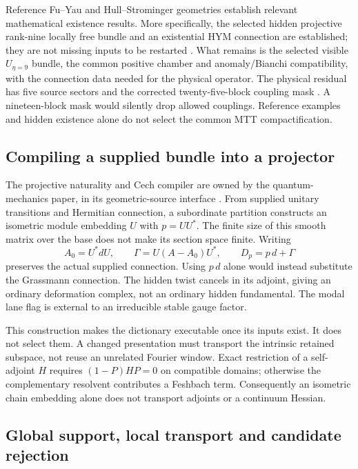 \documentclass[11pt]{article}
\begin{document}
Reference Fu--Yau and Hull--Strominger geometries establish relevant
mathematical existence results. More specifically, the selected hidden
projective rank-nine locally free bundle and an existential HYM connection
are established; they are not missing inputs to be restarted
\cite{OwnerHull}. What remains is the selected visible \(U_{\eta=9}\)
bundle, the common positive chamber and anomaly/Bianchi compatibility,
with the connection data needed for the physical operator. The physical
residual has five source sectors and the corrected twenty-five-block
coupling mask \cite{ConsumerPhysicalResidual}. A nineteen-block mask would
silently drop allowed couplings. Reference examples and hidden existence
alone do not select the common MTT compactification.

\subsection{Compiling a supplied bundle into a projector}
\label{sec:projector-compiler}

The projective naturality and Cech compiler are owned by the
quantum-mechanics paper, in its geometric-source interface
\cite{OwnerQM,ConsumerNaturality,ConsumerCech}. From supplied unitary
transitions and Hermitian connection, a subordinate partition constructs
an isometric module embedding \(U\) with \(p=UU^*\). The finite size of
this smooth matrix over the base does not make its section space finite.
Writing
\[
 A_0=U^*dU,\qquad
 \Gamma=U(A-A_0)U^*,\qquad D_p=p\,d+\Gamma
\]
preserves the actual supplied connection. Using \(p\,d\) alone would
instead substitute the Grassmann connection. The hidden twist cancels
in its adjoint, giving an ordinary deformation complex, not an ordinary
hidden fundamental. The modal lane flag is external to an irreducible
stable gauge factor.

This construction makes the dictionary executable once its inputs exist.
It does not select them. A changed presentation must transport the
intrinsic retained subspace, not reuse an unrelated Fourier window.
Exact restriction of a self-adjoint \(H\) requires
\((1-P)HP=0\) on compatible domains; otherwise the complementary
resolvent contributes a Feshbach term. Consequently an isometric chain
embedding alone does not transport adjoints or a continuum Hessian.

\subsection{Global support, local transport and candidate rejection}
\label{sec:geometric-consumers}
\end{document}
